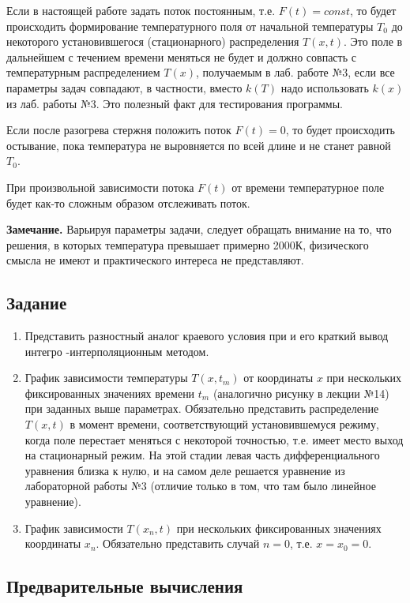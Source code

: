\documentclass[a4paper,14pt]{article}
\begin{document}
Если в настоящей работе задать  поток постоянным, т.е. $F(t) = const$, то  будет происходить формирование температурного поля от начальной температуры
$T_0$ до некоторого установившегося (стационарного) распределения $T(x, t)$.
Это поле в дальнейшем с течением времени меняться не будет и  должно совпасть с температурным распределением $T(x)$, получаемым в лаб. работе №3, если все параметры задач совпадают, в частности, вместо
$k(T)$ надо использовать $k(x)$ из лаб. работы №3. Это полезный факт для тестирования программы.

Если после разогрева стержня положить поток $F(t) = 0$, то будет происходить остывание, пока температура не выровняется по всей длине и не станет равной $T_0$.

При произвольной зависимости потока $F(t)$ от времени температурное поле будет как-то сложным образом отслеживать поток.

\textbf{Замечание.} Варьируя параметры задачи, следует обращать внимание на то, что решения, в которых температура превышает примерно  2000К, физического смысла не имеют и практического интереса не представляют.

\subsection*{Задание}

\begin{enumerate}
	\item Представить разностный аналог краевого условия при  и его краткий вывод интегро -интерполяционным методом.
	\item График зависимости температуры $T(x, t_m)$ от координаты $x$ при нескольких фиксированных значениях времени $t_m$ 
	(аналогично рисунку в лекции №14)  при заданных выше параметрах. Обязательно представить распределение $T(x, t)$ в момент времени, соответствующий установившемуся режиму, когда поле перестает меняться с
	некоторой точностью, т.е. имеет место выход на стационарный режим. На этой стадии левая часть дифференциального уравнения близка к нулю, и на самом деле решается уравнение из лабораторной работы №3 (отличие только в том, что там было линейное уравнение).
	\item График зависимости $T(x_n, t)$ при нескольких фиксированных значениях координаты $x_n$. Обязательно представить случай $n = 0$, т.е. $x = x_0 = 0$.
\end{enumerate}


\subsection*{Предварительные вычисления}
\end{document}
